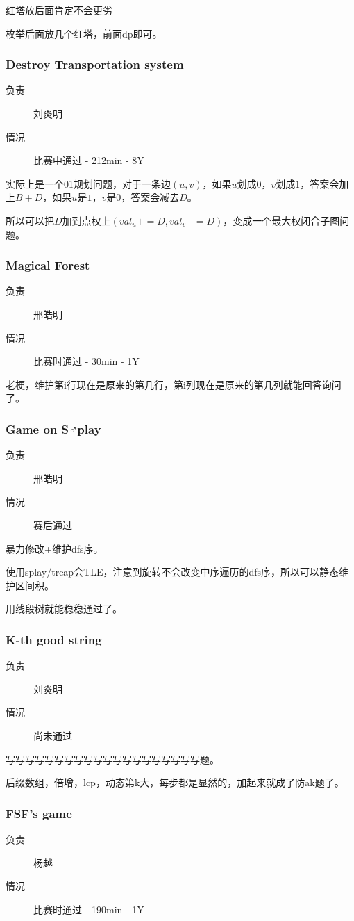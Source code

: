 \documentclass[a4paper, 11pt, nofonts, nocap, fancyhdr]{ctexart}
\newcommand{\problem}[1]{\subsubsection{#1}}
\begin{document}
红塔放后面肯定不会更劣

枚举后面放几个红塔，前面dp即可。

\problem{Destroy Transportation system}

\begin{description}
\item[负责] 刘炎明
\item[情况] 比赛中通过 - 212min - 8Y
\end{description}

实际上是一个01规划问题，对于一条边$(u,v)$，如果$u$划成$0$，$v$划成$1$，答案会加上$B+D$，如果$u$是$1$，$v$是$0$，答案会减去$D$。

所以可以把$D$加到点权上$(val_u += D, val_v -= D)$，变成一个最大权闭合子图问题。

\problem{Magical Forest}

\begin{description}
\item[负责] 邢皓明
\item[情况] 比赛时通过 - 30min - 1Y
\end{description}

老梗，维护第i行现在是原来的第几行，第i列现在是原来的第几列就能回答询问了。

\problem{Game on S♂play}

\begin{description}
\item[负责] 邢皓明
\item[情况] 赛后通过
\end{description}

暴力修改+维护dfs序。

使用splay/treap会TLE，注意到旋转不会改变中序遍历的dfs序，所以可以静态维护区间积。

用线段树就能稳稳通过了。

\problem{K-th good string}

\begin{description}
\item[负责] 刘炎明
\item[情况] 尚未通过
\end{description}

写写写写写写写写写写写写写写写写写写写写题。

后缀数组，倍增，lcp，动态第k大，每步都是显然的，加起来就成了防ak题了。

\problem{FSF’s game}

\begin{description}
\item[负责] 杨越
\item[情况] 比赛时通过 - 190min - 1Y
\end{description}
\end{document}
